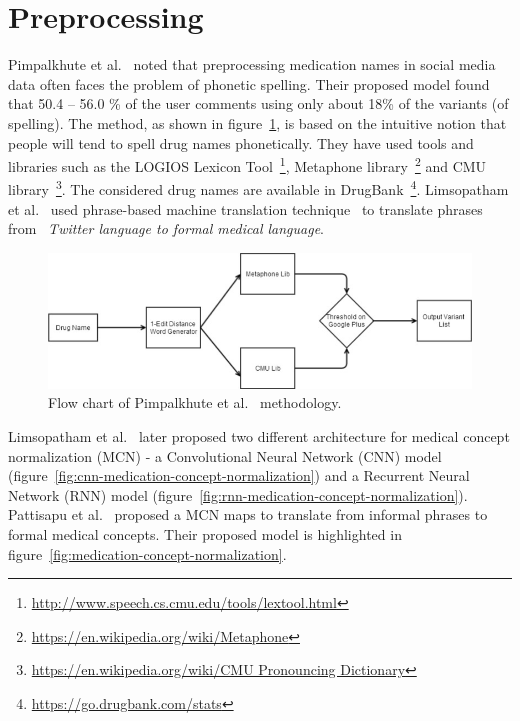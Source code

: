 \section{Preprocessing}

Pimpalkhute et al.~\cite{pimpalkhute2014phonetic} noted that preprocessing medication names in social media data often faces the problem of phonetic spelling. Their proposed model found that 50.4 – 56.0 \% of the user comments using only about 18\% of the variants (of spelling). The method, as shown in figure~\ref{fig:model-pimpalkhute}, is based on the intuitive notion that people will tend to spell drug names phonetically. They have used tools and libraries such as the LOGIOS Lexicon Tool~\footnote{\url{http://www.speech.cs.cmu.edu/tools/lextool.html}}, Metaphone library~\footnote{\url{https://en.wikipedia.org/wiki/Metaphone}} and CMU library~\footnote{\url{https://en.wikipedia.org/wiki/CMU Pronouncing Dictionary}}. The considered drug names are available in DrugBank~\footnote{\url{https://go.drugbank.com/stats}}. Limsopatham et al.~\cite{limsopatham2015adapting} used phrase-based machine translation technique~\cite{koehn2003statistical} to translate phrases from ~\textit{Twitter language to formal medical language}.

\begin{figure}[h]
	\centering
	\includegraphics[width=0.99\linewidth]{Figures/m.png}
	\caption{Flow chart of Pimpalkhute et al.~\cite{pimpalkhute2014phonetic} methodology.}
	\label{fig:model-pimpalkhute}
\end{figure}

Limsopatham et al.~\cite{limsopatham2016normalising} later proposed two different architecture for medical concept normalization (MCN) - a Convolutional Neural Network (CNN) model (figure~\ref{fig:cnn-medication-concept-normalization}) and a Recurrent Neural Network (RNN) model (figure~\ref{fig:rnn-medication-concept-normalization}). Pattisapu et al.~\cite{PATTISAPU2020103522} proposed a MCN  maps to translate from informal phrases to formal medical concepts. Their proposed model is highlighted in figure~\ref{fig:medication-concept-normalization}.

